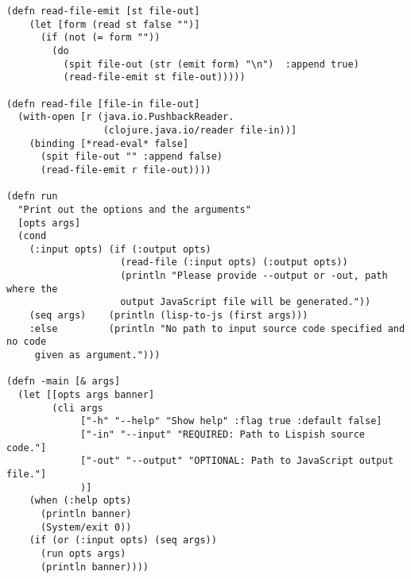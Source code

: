\begin{verbatim}
(defn read-file-emit [st file-out]
    (let [form (read st false "")]
      (if (not (= form ""))
        (do
          (spit file-out (str (emit form) "\n")  :append true)
          (read-file-emit st file-out)))))

(defn read-file [file-in file-out]
  (with-open [r (java.io.PushbackReader.
                 (clojure.java.io/reader file-in))]
    (binding [*read-eval* false]
      (spit file-out "" :append false)
      (read-file-emit r file-out))))

(defn run
  "Print out the options and the arguments"
  [opts args]
  (cond
    (:input opts) (if (:output opts)
                    (read-file (:input opts) (:output opts))
                    (println "Please provide --output or -out, path where the 
                    output JavaScript file will be generated."))
    (seq args)    (println (lisp-to-js (first args)))
    :else         (println "No path to input source code specified and no code
     given as argument.")))

(defn -main [& args]
  (let [[opts args banner]
        (cli args
             ["-h" "--help" "Show help" :flag true :default false]
             ["-in" "--input" "REQUIRED: Path to Lispish source code."]
             ["-out" "--output" "OPTIONAL: Path to JavaScript output file."]
             )]
    (when (:help opts)
      (println banner)
      (System/exit 0))
    (if (or (:input opts) (seq args))
      (run opts args)
      (println banner))))
\end{verbatim}